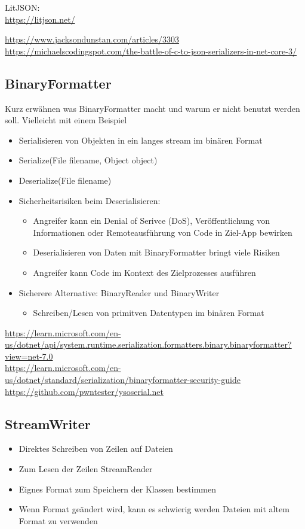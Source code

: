 LitJSON:\\
\url{https://litjson.net/}

\url{https://www.jacksondunstan.com/articles/3303}\\
\url{https://michaelscodingspot.com/the-battle-of-c-to-json-serializers-in-net-core-3/}

\subsection{BinaryFormatter}
Kurz erwähnen was BinaryFormatter macht und warum er nicht benutzt werden soll. Vielleicht mit einem Beispiel

\begin{itemize}
    \item Serialisieren von Objekten in ein langes stream im binären Format
    \item Serialize(File filename, Object object)
    \item Deserialize(File filename)
    \item Sicherheitsrisiken beim Deserialisieren:
    \begin{itemize}
        \item Angreifer kann ein Denial of Serivce (DoS), Veröffentlichung von Informationen oder Remoteausführung von Code in Ziel-App bewirken
        \item Deserialisieren von Daten mit BinaryFormatter bringt viele Risiken
        \item Angreifer kann Code im Kontext des Zielprozesses ausführen
    \end{itemize}
    \item Sicherere Alternative: BinaryReader und BinaryWriter
    \begin{itemize}
        \item Schreiben/Lesen von primitven Datentypen im binären Format
    \end{itemize}
\end{itemize}

\url{https://learn.microsoft.com/en-us/dotnet/api/system.runtime.serialization.formatters.binary.binaryformatter?view=net-7.0}\\
\url{https://learn.microsoft.com/en-us/dotnet/standard/serialization/binaryformatter-security-guide}\\
\url{https://github.com/pwntester/ysoserial.net}

\subsection{StreamWriter}
\begin{itemize}
    \item Direktes Schreiben von Zeilen auf Dateien 
    \item Zum Lesen der Zeilen StreamReader
    \item Eignes Format zum Speichern der Klassen bestimmen
    \item Wenn Format geändert wird, kann es schwierig werden Dateien mit altem Format zu verwenden
\end{itemize}

